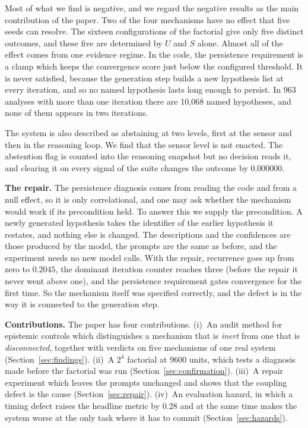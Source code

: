 \documentclass[conference]{IEEEtran}
\begin{document}
Most of what we find is negative, and we regard the negative results as the
main contribution of the paper. Two of the four mechanisms have no effect that
five seeds can resolve. The sixteen configurations of the factorial give only
five distinct outcomes, and these five are determined by $U$ and $S$ alone.
Almost all of the effect comes from one evidence regime. In the code, the
persistence requirement is a clamp which keeps the convergence score just below
the configured threshold. It is never satisfied, because the generation step
builds a new hypothesis list at every iteration, and so no named hypothesis
lasts long enough to persist. In 963 analyses with more than one iteration
there are 10{,}068 named hypotheses, and none of them appears in two
iterations.

The system is also described as abstaining at two levels, first at the sensor
and then in the reasoning loop. We find that the sensor level is not enacted.
The abstention flag is counted into the reasoning snapshot but no decision
reads it, and clearing it on every signal of the suite changes the outcome by
$0.000000$.

\textbf{The repair.}
The persistence diagnosis comes from reading the code and from a null effect,
so it is only correlational, and one may ask whether the mechanism would work
if its precondition held. To answer this we supply the precondition. A newly
generated hypothesis takes the identifier of the earlier hypothesis it
restates, and nothing else is changed. The descriptions and the confidences are
those produced by the model, the prompts are the same as before, and the
experiment needs no new model calls. With the repair, recurrence goes up from
zero to $0.2045$, the dominant iteration counter reaches three (before the
repair it never went above one), and the persistence requirement gates
convergence for the first time. So the mechanism itself was specified
correctly, and the defect is in the way it is connected to the generation
step.

\textbf{Contributions.} The paper has four contributions. (i)~An audit method
for epistemic controls which distinguishes a mechanism that is \emph{inert}
from one that is \emph{disconnected}, together with verdicts on five mechanisms
of one real system (Section~\ref{sec:findings}). (ii)~A $2^4$ factorial at 9600
units, which tests a diagnosis made before the factorial was run
(Section~\ref{sec:confirmation}). (iii)~A repair experiment which leaves the
prompts unchanged and shows that the coupling defect is the cause
(Section~\ref{sec:repair}). (iv)~An evaluation hazard, in which a timing defect
raises the headline metric by $0.28$ and at the same time makes the system
worse at the only task where it has to commit (Section~\ref{sec:hazards}).
\end{document}
